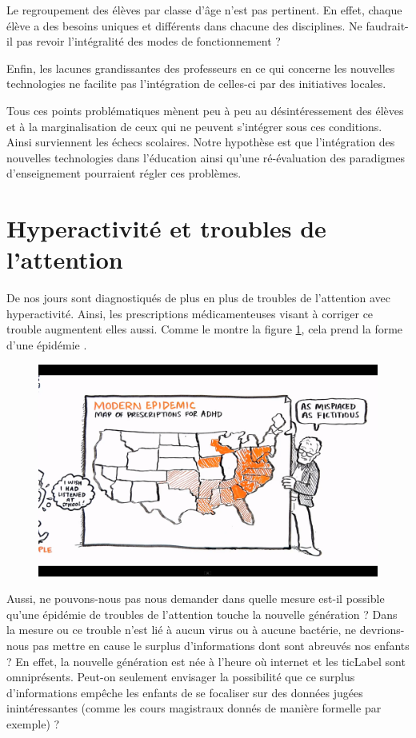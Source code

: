 Le regroupement des élèves par classe d'âge n'est pas pertinent. En effet, chaque élève a des besoins uniques et différents dans chacune des disciplines. Ne faudrait-il pas revoir l'intégralité des modes de fonctionnement ?

Enfin, les lacunes grandissantes des professeurs en ce qui concerne les nouvelles technologies ne facilite pas l'intégration de celles-ci par des initiatives locales.

Tous ces points problématiques mènent peu à peu au désintéressement des élèves et à la marginalisation de ceux qui ne peuvent s'intégrer sous ces conditions. Ainsi surviennent les échecs scolaires. Notre hypothèse est que l'intégration des nouvelles technologies dans l'éducation ainsi qu'une ré-évaluation des paradigmes d'enseignement pourraient régler ces problèmes.

\section{Hyperactivité et troubles de l'attention}
De nos jours sont diagnostiqués de plus en plus de troubles de l'attention avec hyperactivité. Ainsi, les prescriptions médicamenteuses visant à corriger ce trouble augmentent elles aussi. Comme le montre la figure \ref{adhd_map}, cela prend la forme d'une épidémie \cite{robinson2010paradigms}.
\begin{figure}[h]
\includegraphics[trim=1.9cm 1.5cm 0cm 1.5cm, clip=true, width=\linewidth]{../resources/illustrations/ADHD}
\label{adhd_map}
\end{figure}
Aussi, ne pouvons-nous pas nous demander dans quelle mesure est-il possible qu'une épidémie de troubles de l'attention touche la nouvelle génération ? Dans la mesure ou ce trouble n'est lié à aucun virus ou à aucune bactérie, ne devrions-nous pas mettre en cause le surplus d'informations dont sont abreuvés nos enfants ? En effet, la nouvelle génération est née à l'heure où internet et les \gls{ticLabel} sont omniprésents. Peut-on seulement envisager la possibilité que ce surplus d'informations empêche les enfants de se focaliser sur des données jugées inintéressantes (comme les cours magistraux donnés de manière formelle par exemple) ?

